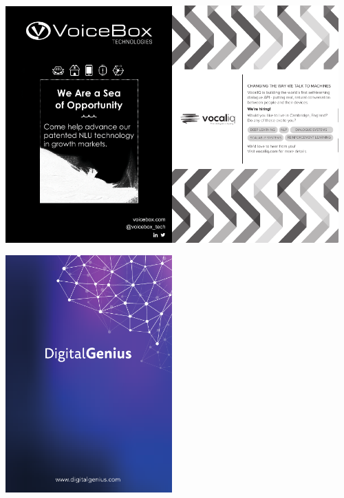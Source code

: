 \begin{center}
\includegraphics[width=0.48\textwidth]{content/images/ads/voicebox}\hfill{}\includegraphics[width=0.48\textwidth]{content/images/ads/vocaliq}
\par\end{center}

\vfill{}


\begin{center}
\includegraphics[width=0.48\textwidth]{content/images/ads/digitalgenius}
\par\end{center}

